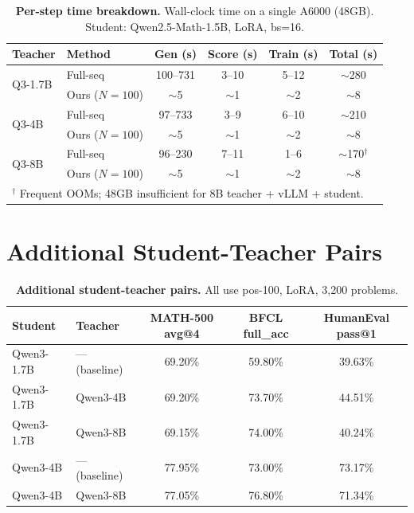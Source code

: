 \documentclass[10pt]{article}
\begin{document}
\begin{table}[!htbp]
\centering
\caption{\textbf{Per-step time breakdown.} Wall-clock time on a single A6000 (48GB). Student: Qwen2.5-Math-1.5B, LoRA, bs=16.}
\label{tab:timing_detailed}
\small
\begin{tabular}{llcccc}
\toprule
\textbf{Teacher} & \textbf{Method} & \textbf{Gen (s)} & \textbf{Score (s)} & \textbf{Train (s)} & \textbf{Total (s)} \\
\midrule
\multirow{2}{*}{Q3-1.7B} & Full-seq & 100--731 & 3--10 & 5--12 & ${\sim}$280 \\
 & Ours ($N{=}100$) & ${\sim}$5 & ${\sim}$1 & ${\sim}$2 & ${\sim}$8 \\
\midrule
\multirow{2}{*}{Q3-4B} & Full-seq & 97--733 & 3--9 & 6--10 & ${\sim}$210 \\
 & Ours ($N{=}100$) & ${\sim}$5 & ${\sim}$1 & ${\sim}$2 & ${\sim}$8 \\
\midrule
\multirow{2}{*}{Q3-8B} & Full-seq & 96--230 & 7--11 & 1--6 & ${\sim}$170$^\dagger$ \\
 & Ours ($N{=}100$) & ${\sim}$5 & ${\sim}$1 & ${\sim}$2 & ${\sim}$8 \\
\bottomrule
\multicolumn{6}{l}{\footnotesize $^\dagger$ Frequent OOMs; 48GB insufficient for 8B teacher + vLLM + student.}
\end{tabular}
\end{table}


\section{Additional Student-Teacher Pairs}
\label{app:additional_pairs}

\begin{table}[!htbp]
\centering
\caption{\textbf{Additional student-teacher pairs.} All use pos-100, LoRA, 3,200 problems.}
\label{tab:additional_pairs}
\small
\begin{tabular}{llccc}
\toprule
\textbf{Student} & \textbf{Teacher} & \textbf{MATH-500 avg@4} & \textbf{BFCL full\_acc} & \textbf{HumanEval pass@1} \\
\midrule
Qwen3-1.7B & --- (baseline) & 69.20\% & 59.80\% & 39.63\% \\
Qwen3-1.7B & Qwen3-4B & 69.20\% & 73.70\% & 44.51\% \\
Qwen3-1.7B & Qwen3-8B & 69.15\% & 74.00\% & 40.24\% \\
\midrule
Qwen3-4B & --- (baseline) & 77.95\% & 73.00\% & 73.17\% \\
Qwen3-4B & Qwen3-8B & 77.05\% & 76.80\% & 71.34\% \\
\bottomrule
\end{tabular}
\end{table}
\end{document}
